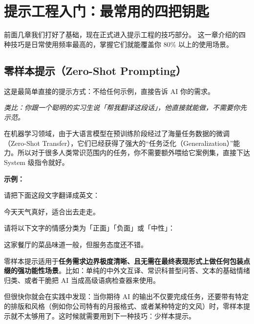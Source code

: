 % 
% 


\chapter{提示工程入门：最常用的四把钥匙}
\label{ch:prompting-basics}

前面几章我们打好了基础，现在正式进入提示工程的技巧部分。
这一章介绍的四种技巧是日常使用频率最高的，掌握它们就能覆盖你 80\% 以上的使用场景。

\section{零样本提示（Zero-Shot Prompting）}
\label{sec:zero-shot}

这是最简单直接的提示方式：不给任何示例，直接告诉 AI 你的需求。

\textit{类比：你跟一个聪明的实习生说「帮我翻译这段话」，他直接就能做，不需要你先示范。}

在机器学习领域，由于大语言模型在预训练阶段经过了海量任务数据的微调（Zero-Shot Transfer），它们已经获得了强大的“任务泛化（Generalization）”能力。所以对于很多人类常识范围内的任务，你不需要额外喂给它案例集，直接下达 System 级指令就好。

\textbf{示例：}

\begin{promptbox}
请把下面这段文字翻译成英文：

今天天气真好，适合出去走走。
\end{promptbox}

\begin{promptbox}
请将以下文字的情感分类为「正面」「负面」或「中性」：

这家餐厅的菜品味道一般，但服务态度还不错。
\end{promptbox}

零样本提示适用于\textbf{任务需求边界极度清晰、且无需在最终表现形式上做任何包装点缀的强功能性场景}。比如：单纯的中外文互译、常识科普型问答、文本的基础情绪归类、或者干脆把 AI 当成高级语病检查器来使用。

但很快你就会在实践中发现：当你期待 AI 的输出不仅要完成任务，还要带有特定的排版和风格（例如你公司特有的月报格式、或者某种特定的文风）时，零样本提示就不太够用了。这时候就需要用到下一种技巧：少样本提示。

